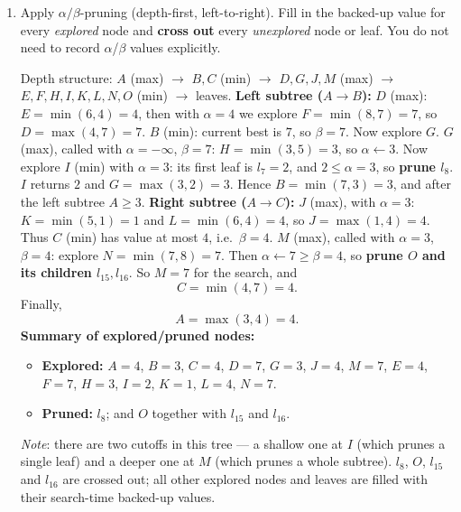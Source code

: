 \noindent
\begin{enumerate}
    \item \points[8] Apply $\alpha/\beta$-pruning (depth-first, left-to-right).
Fill in the backed-up value for every \emph{explored} node and
\textbf{cross out} every \emph{unexplored} node or leaf.
You do not need to record $\alpha$/$\beta$ values explicitly.
\begin{solution}
Depth structure: $A$ (max) $\to$ $B,C$ (min) $\to$ $D,G,J,M$ (max) $\to$ $E,F,H,I,K,L,N,O$ (min) $\to$ leaves.
\medskip
\noindent \textbf{Left subtree ($A \to B$):}
\smallskip
$D$ (max): $E=\min(6,4)=4$, then with $\alpha=4$ we explore $F=\min(8,7)=7$, so $D=\max(4,7)=7$.
$B$ (min): current best is $7$, so $\beta=7$. Now explore $G$.
$G$ (max), called with $\alpha=-\infty$, $\beta=7$: $H=\min(3,5)=3$, so $\alpha \leftarrow 3$.
Now explore $I$ (min) with $\alpha=3$: its first leaf is $l_7=2$, and $2 \le \alpha = 3$, so
\textbf{prune $l_8$}. $I$ returns $2$ and $G=\max(3,2)=3$.
Hence $B=\min(7,3)=3$, and after the left subtree $A \ge 3$.
\medskip
\noindent \textbf{Right subtree ($A \to C$):}
\smallskip
$J$ (max), with $\alpha=3$: $K=\min(5,1)=1$ and $L=\min(6,4)=4$, so $J=\max(1,4)=4$.
Thus $C$ (min) has value at most $4$, i.e.\ $\beta=4$.
$M$ (max), called with $\alpha=3$, $\beta=4$: explore $N=\min(7,8)=7$. Then $\alpha \leftarrow 7 \ge \beta=4$,
so \textbf{prune $O$ and its children $l_{15}, l_{16}$}.
So $M=7$ for the search, and
\[
C=\min(4,7)=4.
\]
Finally,
\[
A=\max(3,4)=4.
\]
\medskip
\noindent \textbf{Summary of explored/pruned nodes:}
\begin{itemize}
  \item \textbf{Explored:} $A=4$, $B=3$, $C=4$, $D=7$, $G=3$, $J=4$, $M=7$, $E=4$, $F=7$, $H=3$, $I=2$, $K=1$, $L=4$, $N=7$.
  \item \textbf{Pruned:} $l_8$; and $O$ together with $l_{15}$ and $l_{16}$.
\end{itemize}
\medskip
\noindent \textit{Note}: there are two cutoffs in this tree --- a shallow one at $I$ (which prunes a
single leaf) and a deeper one at $M$ (which prunes a whole subtree). $l_8$, $O$, $l_{15}$ and $l_{16}$
are crossed out; all other explored nodes and leaves are filled with their search-time backed-up values.
\end{solution}
\end{enumerate}
\clearpage

